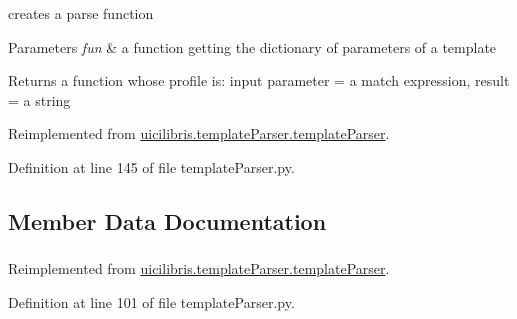 creates a parse function 


\begin{DoxyParams}{\-Parameters}
{\em fun} & a function getting the dictionary of parameters of a template \\
\hline
\end{DoxyParams}
\begin{DoxyReturn}{\-Returns}
a function whose profile is\-: input parameter = a match expression, result = a string 
\end{DoxyReturn}


\-Reimplemented from \hyperlink{classuicilibris_1_1templateParser_1_1templateParser_a48f677f123127c39f6c84eb3737e2ded}{uicilibris.\-template\-Parser.\-template\-Parser}.



\-Definition at line 145 of file template\-Parser.\-py.



\subsection{\-Member \-Data \-Documentation}
\hypertarget{classuicilibris_1_1templateParser_1_1imageParser_acbade4bd60a213ae591dad90f64021a7}{
\subsubsection[{pattern}]{}}\label{classuicilibris_1_1templateParser_1_1imageParser_acbade4bd60a213ae591dad90f64021a7}


\-Reimplemented from \hyperlink{classuicilibris_1_1templateParser_1_1templateParser_a11df7ff35853b6cc9015f5c5451aa921}{uicilibris.\-template\-Parser.\-template\-Parser}.



\-Definition at line 101 of file template\-Parser.\-py.

\hypertarget{classuicilibris_1_1templateParser_1_1imageParser_aaf8ed396434c4dc4b6edc3dcf1ffbbd2}{
\subsubsection[{regexp}]{}}\label{classuicilibris_1_1templateParser_1_1imageParser_aaf8ed396434c4dc4b6edc3dcf1ffbbd2}


